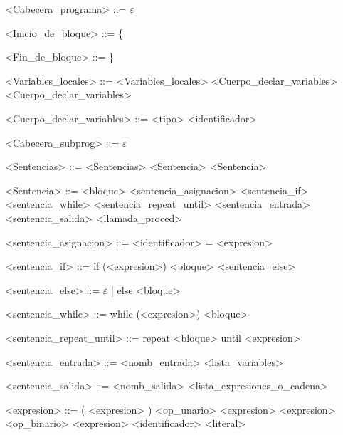 \documentclass{scrartcl}
\begin{document}
\begin{grammar}
<Cabecera_programa> ::= $\varepsilon$

<Inicio_de_bloque> ::= \{

<Fin_de_bloque> ::= \}

<Variables_locales> ::= <Variables_locales> <Cuerpo_declar_variables>
\alt <Cuerpo_declar_variables>

<Cuerpo_declar_variables> ::= <tipo> <identificador> %

<Cabecera_subprog> ::= $\varepsilon$

<Sentencias> ::= <Sentencias> <Sentencia>
\alt <Sentencia>

<Sentencia> ::= <bloque>
\alt <sentencia_asignacion>
\alt <sentencia_if>
\alt <sentencia_while>
\alt <sentencia_repeat_until>
\alt <sentencia_entrada>
\alt <sentencia_salida>
\alt <llamada_proced>

<sentencia_asignacion> ::=  <identificador> = <expresion>

<sentencia_if> ::= if (<expresion>) <bloque> <sentencia_else>

<sentencia_else> ::= $\varepsilon$ | else <bloque>

<sentencia_while> ::= while (<expresion>) <bloque>

<sentencia_repeat_until> ::= repeat <bloque> until <expresion>

<sentencia_entrada> ::= <nomb_entrada> <lista_variables>

<sentencia_salida> ::= <nomb_salida> <lista_expresiones_o_cadena>

<expresion> ::= ( <expresion> )
\alt <op_unario> <expresion>
\alt <expresion> <op_binario> <expresion>
\alt <identificador>
\alt <literal>


\end{grammar}
\end{document}
